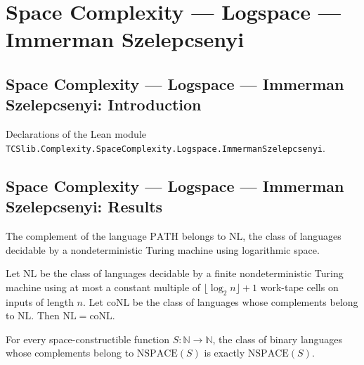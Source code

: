\section{Space Complexity --- Logspace --- Immerman Szelepcsenyi}
\subsection*{Space Complexity --- Logspace --- Immerman Szelepcsenyi: Introduction}

Declarations of the Lean module \texttt{TCSlib.Complexity.SpaceComplexity.Logspace.ImmermanSzelepcsenyi}.

\subsection*{Space Complexity --- Logspace --- Immerman Szelepcsenyi: Results}

\begin{theorem}
\label{Complexity.compl_PATH_mem_NL}
\leanok
{}
The complement of the language $\mathrm{PATH}$ belongs to $\mathrm{NL}$, the class of
languages decidable by a nondeterministic Turing machine using logarithmic space.
\end{theorem}

\begin{theorem}
\label{Complexity.NL_eq_coNL}
\leanok
{}
Let $\mathrm{NL}$ be the class of languages decidable by a finite nondeterministic
Turing machine using at most a constant multiple of $\lfloor\log_2 n\rfloor+1$ work-tape
cells on inputs of length $n$. Let $\mathrm{coNL}$ be the class of languages whose
complements belong to $\mathrm{NL}$. Then $\mathrm{NL}=\mathrm{coNL}$.
\end{theorem}

\begin{theorem}
\label{Complexity.NSPACE_compl_eq}
\leanok
{}
For every space-constructible function $S:\mathbb{N}\to\mathbb{N}$, the class of binary
languages whose complements belong to $\mathrm{NSPACE}(S)$ is exactly
$\mathrm{NSPACE}(S)$.
\end{theorem}
